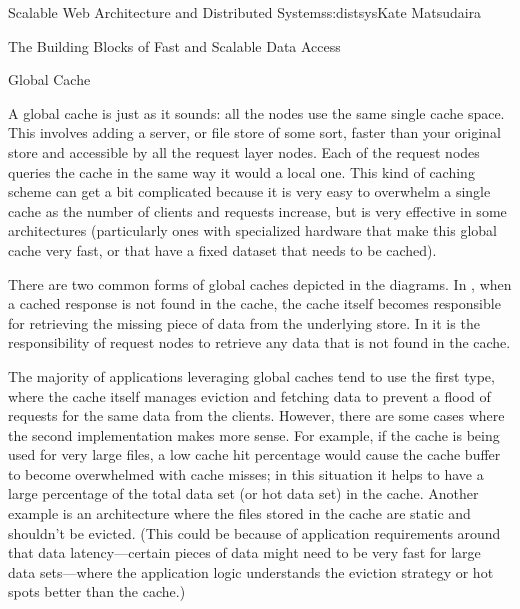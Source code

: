 \begin{aosachapter}{Scalable Web Architecture and Distributed Systems}{s:distsys}{Kate Matsudaira}
\begin{aosasect1}{The Building Blocks of Fast and Scalable Data Access}
\begin{aosasect2}{Global Cache}

A global cache is just as it sounds: all the nodes use the same single cache
space. This involves adding a server, or file store of some sort,
faster than your original store and accessible by all the request
layer nodes. Each of the request nodes queries the cache in the same
way it would a local one. This kind of caching scheme can get a bit
complicated because it is very easy to overwhelm a single cache as the
number of clients and requests increase, but is very effective in some
architectures (particularly ones with specialized hardware that make
this global cache very fast, or that have a fixed dataset that needs to be
cached).

There are two common forms of global caches depicted in the
diagrams. In , when a cached response is not found in
the cache, the cache itself becomes responsible for retrieving the
missing piece of data from the underlying store. In 
it is the responsibility of request nodes to retrieve any data that is
not found in the cache.



The majority of applications leveraging global caches tend to use the
first type, where the cache itself manages eviction and fetching data to
prevent a flood of requests for the same data from the
clients. However, there are some cases where the second
implementation makes more sense. For example, if the cache is being
used for very large files, a low cache hit percentage would cause the
cache buffer to become overwhelmed with cache misses; in this
situation it helps to have a large percentage of the total data set
(or hot data set) in the cache. Another example is an architecture where
the files stored in the cache are static and shouldn't be evicted.
(This could be because of application requirements around that data 
latency---certain pieces of data might need to be very fast for large
data sets---where the application logic understands the eviction
strategy or hot spots better than the cache.)

\end{aosasect2}


\end{aosasect1}
\end{aosachapter}
